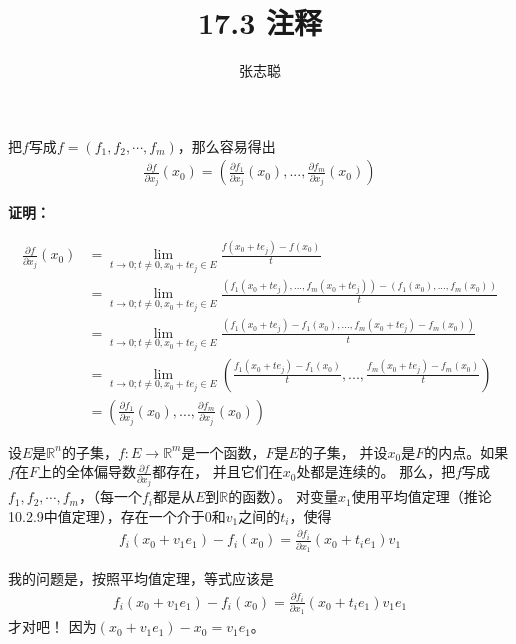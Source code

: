 \documentclass{article}
\begin{document}
\title{17.3 注释}
\author{张志聪}
\maketitle

\begin{zremark}
  把$f$写成$f = (f_1, f_2, \cdots, f_m)$，那么容易得出
  \begin{align*}
    \frac{\partial f}{\partial x_j}(x_0) = (\frac{\partial f_1}{\partial x_j}(x_0),..., \frac{\partial f_m}{\partial x_j}(x_0))
  \end{align*}
\end{zremark}

\textbf{证明：}

\begin{align*}
  \frac{\partial f}{\partial x_j} (x_0)
   & = \lim\limits_{t \to 0; t \neq 0, x_0 + te_j \in E} \frac{f(x_0 + te_j) - f(x_0)}{t}                                              \\
   & = \lim\limits_{t \to 0; t \neq 0, x_0 + te_j \in E} \frac{(f_1(x_0 + te_j), ..., f_m(x_0 + te_j)) - (f_1(x_0),..., f_m(x_0))}{t}  \\
   & = \lim\limits_{t \to 0; t \neq 0, x_0 + te_j \in E} \frac{(f_1(x_0 + te_j)-f_1(x_0), ..., f_m(x_0 + te_j) - f_m(x_0))}{t}         \\
   & = \lim\limits_{t \to 0; t \neq 0, x_0 + te_j \in E} (\frac{f_1(x_0 + te_j)-f_1(x_0)}{t}, ..., \frac{f_m(x_0 + te_j)-f_m(x_0)}{t}) \\
   & = (\frac{\partial f_1}{\partial x_j}(x_0),..., \frac{\partial f_m}{\partial x_j}(x_0))
\end{align*}

\begin{zremark}
  设$E$是$\mathbb{R}^n$的子集，$f : E \to \mathbb{R}^m$是一个函数，$F$是$E$的子集，
  并设$x_0$是$F$的内点。如果$f$在$F$上的全体偏导数$\frac{\partial f}{\partial x_j}$都存在，
  并且它们在$x_0$处都是连续的。
  那么，把$f$写成$f_1, f_2, \cdots, f_m$，（每一个$f_i$都是从$E$到$\mathbb{R}$的函数）。
  对变量$x_1$使用平均值定理（推论10.2.9中值定理），存在一个介于$0$和$v_1$之间的$t_i$，使得
  \begin{align*}
    f_i(x_0 + v_1e_1) - f_i(x_0) = \frac{\partial f_i}{\partial x_1}(x_0 + t_ie_1)v_1
  \end{align*}

  我的问题是，按照平均值定理，等式应该是
  \begin{align*}
    f_i(x_0 + v_1e_1) - f_i(x_0) = \frac{\partial f_i}{\partial x_1}(x_0 + t_ie_1)v_1e_1
  \end{align*}
  才对吧！
  因为$(x_0 + v_1e_1) - x_0 = v_1 e_1$。
\end{zremark}
\end{document}
